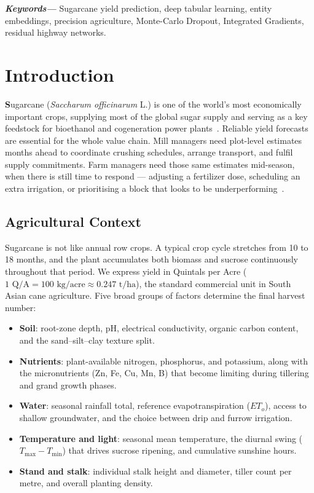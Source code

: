 \documentclass[conference,10pt,letterpaper]{IEEEtran}
\providecommand{\IEEEPARstart}[2]{\textbf{#1}#2}
\newenvironment{IEEEkeywords}{\vspace{4pt}\noindent\textbf{\textit{Keywords---}}\ignorespaces}{\par\vspace{6pt}}
\begin{document}
\begin{IEEEkeywords}
Sugarcane yield prediction, deep tabular learning, entity embeddings, precision agriculture, Monte-Carlo Dropout, Integrated Gradients, residual highway networks.
\end{IEEEkeywords}

\section{Introduction}

\IEEEPARstart{S}{ugarcane} (\textit{Saccharum officinarum} L.) is one of the world's most economically important crops, supplying most of the global sugar supply and serving as a key feedstock for bioethanol and cogeneration power plants~\cite{canata2024ai}. Reliable yield forecasts are essential for the whole value chain. Mill managers need plot-level estimates months ahead to coordinate crushing schedules, arrange transport, and fulfil supply commitments. Farm managers need those same estimates mid-season, when there is still time to respond --- adjusting a fertilizer dose, scheduling an extra irrigation, or prioritising a block that looks to be underperforming~\cite{somard2024sugarcane}.

\subsection{Agricultural Context}
Sugarcane is not like annual row crops. A typical crop cycle stretches from 10 to 18 months, and the plant accumulates both biomass and sucrose continuously throughout that period. We express yield in Quintals per Acre ($1\text{ Q/A} = 100\text{ kg/acre} \approx 0.247\text{ t/ha}$), the standard commercial unit in South Asian cane agriculture. Five broad groups of factors determine the final harvest number:
\begin{itemize}
    \item \textbf{Soil}: root-zone depth, pH, electrical conductivity, organic carbon content, and the sand--silt--clay texture split.
    \item \textbf{Nutrients}: plant-available nitrogen, phosphorus, and potassium, along with the micronutrients (Zn, Fe, Cu, Mn, B) that become limiting during tillering and grand growth phases.
    \item \textbf{Water}: seasonal rainfall total, reference evapotranspiration ($ET_o$), access to shallow groundwater, and the choice between drip and furrow irrigation.
    \item \textbf{Temperature and light}: seasonal mean temperature, the diurnal swing ($T_{\max} - T_{\min}$) that drives sucrose ripening, and cumulative sunshine hours.
    \item \textbf{Stand and stalk}: individual stalk height and diameter, tiller count per metre, and overall planting density.
\end{itemize}
\end{document}

